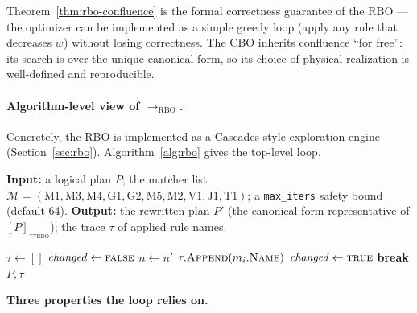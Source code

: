 \documentclass[sigconf,nonacm,review]{acmart}
\theoremstyle{plain}
\theoremstyle{definition}
\theoremstyle{remark}
\begin{document}
Theorem~\ref{thm:rbo-confluence} is the formal correctness
guarantee of the RBO --- the optimizer can be implemented as
a simple greedy loop (apply any rule that decreases $w$)
without losing correctness. The CBO inherits confluence
``for free'': its search is over the unique canonical form,
so its choice of physical realization is well-defined and
reproducible.

\paragraph{Algorithm-level view of $\to_{\mathrm{RBO}}$.}
Concretely, the RBO is implemented as a Cascades-style
exploration engine
(Section~\ref{sec:rbo}). Algorithm~\ref{alg:rbo} gives the
top-level loop.

\begin{algorithm}[t]
\caption{RBO fixed-point loop with priority-ordered matchers.}\label{alg:rbo}
\textbf{Input:} a logical plan $P$; the matcher list
$\mathcal{M} = (\mathrm{M1}, \mathrm{M3}, \mathrm{M4},
\mathrm{G1}, \mathrm{G2}, \mathrm{M5}, \mathrm{M2},
\mathrm{V1}, \mathrm{J1}, \mathrm{T1})$; a
\texttt{max\_iters} safety bound (default 64).
\textbf{Output:} the rewritten plan $P'$ (the
canonical-form representative of $[P]_{\to_{\mathrm{RBO}}}$);
the trace $\tau$ of applied rule names.
\begin{algorithmic}[1]
  \State $\tau \gets []$
  \Repeat
    \State $\mathit{changed} \gets \textsc{false}$
          \State $n \gets n'$
          \State $\tau.\Call{Append}{m_i.\textsc{Name}}$
          \State $\mathit{changed} \gets \textsc{true}$
          \State \textbf{break} 
        \EndIf
      \EndFor
    \EndFor
  \State \Return $P, \tau$
\end{algorithmic}
\end{algorithm}

\noindent\textbf{Three properties the loop relies on.}
\end{document}
